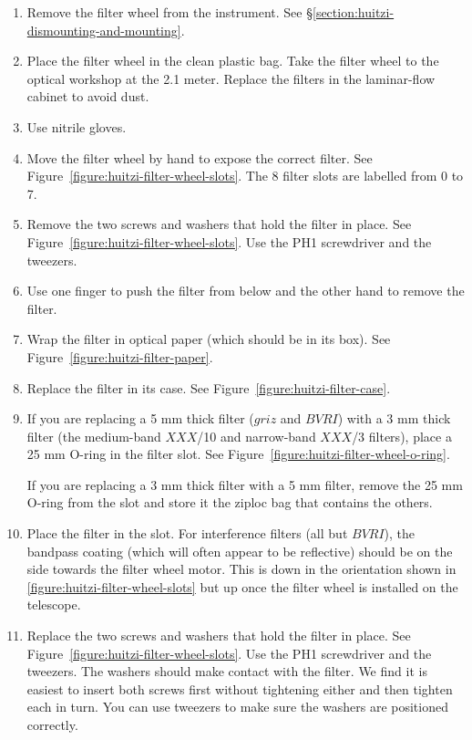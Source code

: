 \begin{enumerate}
    \item Remove the filter wheel from the instrument. See \S\ref{section:huitzi-dismounting-and-mounting}.
    \item Place the filter wheel in the clean plastic bag. Take the filter wheel to the optical workshop at the 2.1 meter. Replace the filters in the laminar-flow cabinet to avoid dust.
    \item Use nitrile gloves.
    \item Move the filter wheel by hand to expose the correct filter. See Figure~\ref{figure:huitzi-filter-wheel-slots}. The 8 filter slots are labelled from 0 to 7.
    \item Remove the two screws and washers that hold the filter in place. See Figure~\ref{figure:huitzi-filter-wheel-slots}.  Use the PH1 screwdriver and the tweezers.
    \item Use one finger to push the filter from below and the other hand to remove the filter.
    \item Wrap the filter in optical paper (which should be in its box). See Figure~\ref{figure:huitzi-filter-paper}.
    \item Replace the filter in its case. See Figure~\ref{figure:huitzi-filter-case}.
    \item If you are replacing a 5 mm thick filter ($griz$ and $BVRI$) with a 3 mm thick filter (the medium-band $XXX$/10 and narrow-band $XXX$/3 filters), place a 25 mm O-ring in the filter slot. See Figure~\ref{figure:huitzi-filter-wheel-o-ring}.
    
    If you are replacing a 3 mm thick filter with a 5 mm filter, remove the 25 mm O-ring from the slot and store it the ziploc bag that contains the others.
    
    \item Place the filter in the slot. For interference filters (all but $BVRI$), the bandpass coating (which will often appear to be reflective) should be on the side towards the filter wheel motor. This is down in the orientation shown in \ref{figure:huitzi-filter-wheel-slots} but up once the filter wheel is installed on the telescope.
    
    \item Replace the  two screws and washers that hold the filter in place. See Figure~\ref{figure:huitzi-filter-wheel-slots}.  Use the PH1 screwdriver and the tweezers. The washers should make contact with the filter. We find it is easiest to insert both screws first without tightening either and then tighten each in turn. You can use tweezers to make sure the washers are positioned correctly.
    

\end{enumerate}
